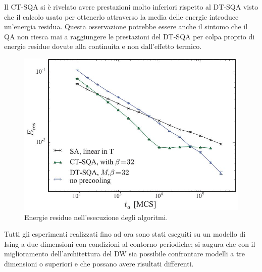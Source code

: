 Il CT-SQA si è rivelato avere prestazioni molto inferiori rispetto al DT-SQA visto che il calcolo usato per ottenerlo attraverso la media delle energie introduce un'energia residua. Questa osservazione potrebbe essere anche il sintomo che il QA non riesca mai a raggiungere le prestazioni del DT-SQA per colpa proprio di energie residue dovute alla continuita e non dall'effetto termico.

\begin{figure}[htbp]
\centering
\includegraphics[scale=0.6]{Immagini/residua.jpg}
\caption{Energie residue nell'esecuzione degli algoritmi.}
\label{figura:residua}
\end{figure}
Tutti gli esperimenti realizzati fino ad ora sono stati eseguiti su un modello di Ising a due dimensioni con condizioni al contorno periodiche; si augura che con il miglioramento dell'architettura del DW sia possibile confrontare modelli a tre dimensioni o superiori e che possano avere risultati differenti.
